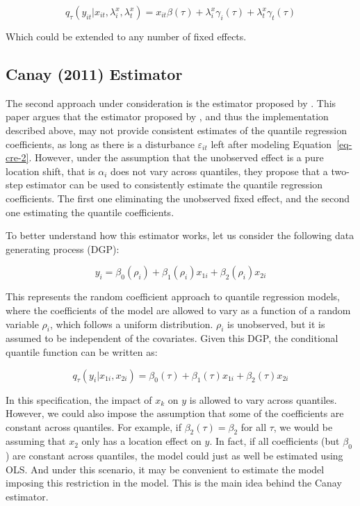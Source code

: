 \documentclass[bib]{statapress}
\begin{document}
\[q_\tau(y_{it}|x_{it},\lambda_i^x,\lambda_t^x)=x_{it}\beta(\tau)+\lambda^x_i\gamma_i(\tau)+\lambda^x_t\gamma_t(\tau)  
\]

Which could be extended to any number of fixed effects.

\subsection{Canay (2011) Estimator}\label{sec-canay}

The second approach under consideration is the estimator proposed by
\citet{canay2011}. This paper argues that the estimator proposed by
\citet{abrevaya2008}, and thus the implementation described above, may
not provide consistent estimates of the quantile regression
coefficients, as long as there is a disturbance \(\varepsilon_{it}\)
left after modeling Equation~\ref{eq-cre-2}. However, under the
assumption that the unobserved effect is a pure location shift, that is
\(\alpha_i\) does not vary across quantiles, they propose that a
two-step estimator can be used to consistently estimate the quantile
regression coefficients. The first one eliminating the unobserved fixed
effect, and the second one estimating the quantile coefficients.

To better understand how this estimator works, let us consider the
following data generating process (DGP):

\[y_{i} =\beta_0(\rho_{i}) +  \beta_1(\rho_{i}) x_{1i} + \beta_2(\rho_{i}) x_{2i} 
\]

This represents the random coefficient approach to quantile regression
models, where the coefficients of the model are allowed to vary as a
function of a random variable \(\rho_{i}\), which follows a uniform
distribution. \(\rho_i\) is unobserved, but it is assumed to be
independent of the covariates. Given this DGP, the conditional quantile
function can be written as:

\[q_{\tau}(y_{i}|x_{1i},x_{2i}) = \beta_0(\tau) + \beta_1(\tau) x_{1i} + \beta_2(\tau) x_{2i}\]

In this specification, the impact of \(x_{k}\) on \(y\) is allowed to
vary across quantiles. However, we could also impose the assumption that
some of the coefficients are constant across quantiles. For example, if
\(\beta_2(\tau)=\beta_2\) for all \(\tau\), we would be assuming that
\(x_2\) only has a location effect on \(y\). In fact, if all
coefficients (but \(\beta_0\)) are constant across quantiles, the model
could just as well be estimated using OLS. And under this scenario, it
may be convenient to estimate the model imposing this restriction in the
model. This is the main idea behind the Canay estimator.
\end{document}
